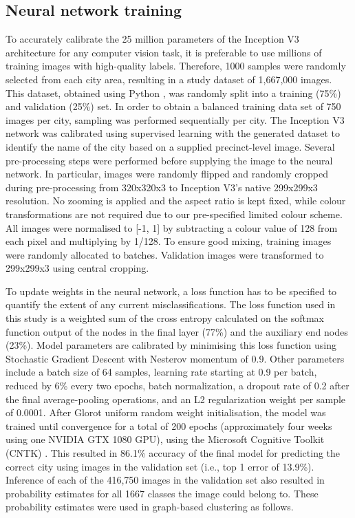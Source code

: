 \documentclass[final,3p,times,authoryear]{elsarticle}
\begin{document}
 \subsection{Neural network training}\label{sec:methods4}    

To accurately calibrate the 25 million parameters of the Inception V3 architecture for any computer vision task, it is preferable to use millions of training images with high-quality labels. Therefore, 1000 samples were randomly selected from each city area, resulting in a study dataset of 1,667,000 images. This dataset, obtained using Python \citep{Python2016}, was randomly split into a training (75\%) and validation (25\%) set. In order to obtain a balanced training data set of 750 images per city, sampling was performed sequentially per city.
The Inception V3 network was calibrated using supervised learning with the generated dataset to identify the name of the city based on a supplied precinct-level image. Several pre-processing steps were performed before supplying the image to the neural network. In particular, images were randomly flipped and randomly cropped during pre-processing from 320x320x3 to Inception V3’s native 299x299x3 resolution. No zooming is applied and the aspect ratio is kept fixed, while colour transformations are not required due to our pre-specified limited colour scheme. All images were normalised to [-1, 1] by subtracting a colour value of 128 from each pixel and multiplying by 1/128. To ensure good mixing, training images were randomly allocated to batches. Validation images were transformed to 299x299x3 using central cropping.

To update weights in the neural network, a loss function has to be specified to quantify the extent of any current misclassifications. The loss function used in this study is a weighted sum of the cross entropy calculated on the softmax function output of the nodes in the final layer (77\%) and the auxiliary end nodes (23\%). Model parameters are calibrated by minimising this loss function using Stochastic Gradient Descent with Nesterov momentum of 0.9. Other parameters include a batch size of 64 samples, learning rate starting at 0.9 per batch, reduced by 6\% every two epochs, batch normalization, a dropout rate of 0.2 after the final average-pooling operations, and an L2 regularization weight per sample of 0.0001. After Glorot uniform random weight initialisation, the model was trained until convergence for a total of 200 epochs (approximately four weeks using one NVIDIA GTX 1080 GPU), using the Microsoft Cognitive Toolkit (CNTK) \citep{Yu2015}. This resulted in 86.1\% accuracy of the final model for predicting the correct city using images in the validation set (i.e., top 1 error of 13.9\%). Inference of each of the 416,750 images in the validation set also resulted in probability estimates for all 1667 classes the image could belong to. These probability estimates were used in graph-based clustering as follows.
\end{document}
